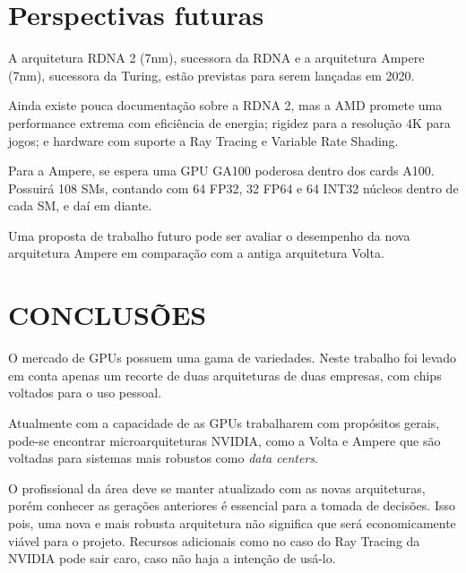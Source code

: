 \documentclass[letterpaper, 10 pt, conference]{ieeeconf}  %
\begin{document}
\section{Perspectivas futuras}

A arquitetura RDNA 2 (7nm), sucessora da RDNA e a arquitetura Ampere (7nm), sucessora da Turing, estão previstas para serem lançadas em 2020.

Ainda existe pouca documentação sobre a RDNA 2, mas a AMD promete uma performance extrema com eficiência de energia; rigidez para a resolução 4K para jogos; e hardware com suporte a Ray Tracing e Variable Rate Shading.

Para a Ampere, se espera uma GPU GA100 poderosa dentro dos cards A100. Possuirá 108 SMs, contando com 64 FP32, 32 FP64 e 64 INT32 núcleos dentro de cada SM, e daí em diante. 

Uma proposta de trabalho futuro pode ser avaliar o desempenho da nova arquitetura Ampere em comparação com a antiga arquitetura Volta.













\section{CONCLUSÕES}

O mercado de GPUs possuem uma gama de variedades. Neste trabalho foi levado em conta apenas um recorte de duas arquiteturas de duas empresas, com chips voltados para o uso pessoal. 

Atualmente com a capacidade de as GPUs trabalharem com propósitos gerais, pode-se encontrar microarquiteturas NVIDIA, como a Volta e Ampere que são voltadas para sistemas mais robustos como \textit{data centers}. 

O profissional da área deve se manter atualizado com as novas arquiteturas, porém conhecer as gerações anteriores é essencial para a tomada de decisões. Isso pois, uma nova e mais robusta arquitetura não significa que será economicamente viável para o projeto. Recursos adicionais como no caso do Ray Tracing da NVIDIA pode sair caro, caso não haja a intenção de usá-lo.



\addtolength{\textheight}{-12cm}   %
\end{document}
